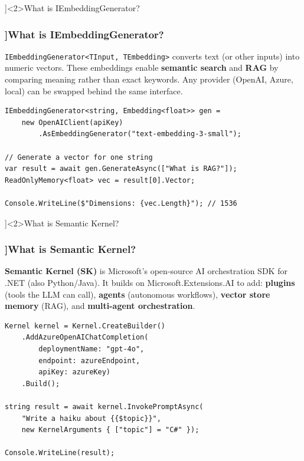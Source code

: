 \QuestionSlide[\CategoryBadge[AIColor!20]{AI \& .NET}]<2>{What is IEmbeddingGenerator?}

\begin{frame}[fragile]
  \frametitle{\AnswerTitle[\CategoryBadge[AIColor!20]{AI \& .NET}]{What is IEmbeddingGenerator?}}

  {\footnotesize
  \texttt{IEmbeddingGenerator<TInput, TEmbedding>} converts text (or other inputs) into numeric vectors.
  These embeddings enable \textbf{semantic search} and \textbf{RAG} by comparing meaning rather than
  exact keywords. Any provider (OpenAI, Azure, local) can be swapped behind the same interface.
  }

  \begin{verbatim}
IEmbeddingGenerator<string, Embedding<float>> gen =
    new OpenAIClient(apiKey)
        .AsEmbeddingGenerator("text-embedding-3-small");

// Generate a vector for one string
var result = await gen.GenerateAsync(["What is RAG?"]);
ReadOnlyMemory<float> vec = result[0].Vector;

Console.WriteLine($"Dimensions: {vec.Length}"); // 1536
  \end{verbatim}
\end{frame}

\QuestionSlide[\CategoryBadge[AIColor!20]{AI \& .NET}]<2>{What is Semantic Kernel?}

\begin{frame}[fragile]
  \frametitle{\AnswerTitle[\CategoryBadge[AIColor!20]{AI \& .NET}]{What is Semantic Kernel?}}

  {\footnotesize
  \textbf{Semantic Kernel (SK)} is Microsoft's open-source AI orchestration SDK for .NET (also Python/Java).
  It builds on Microsoft.Extensions.AI to add: \textbf{plugins} (tools the LLM can call),
  \textbf{agents} (autonomous workflows), \textbf{vector store memory} (RAG), and
  \textbf{multi-agent orchestration}.
  }

  \begin{verbatim}
Kernel kernel = Kernel.CreateBuilder()
    .AddAzureOpenAIChatCompletion(
        deploymentName: "gpt-4o",
        endpoint: azureEndpoint,
        apiKey: azureKey)
    .Build();

string result = await kernel.InvokePromptAsync(
    "Write a haiku about {{$topic}}",
    new KernelArguments { ["topic"] = "C#" });

Console.WriteLine(result);
  \end{verbatim}
\end{frame}

